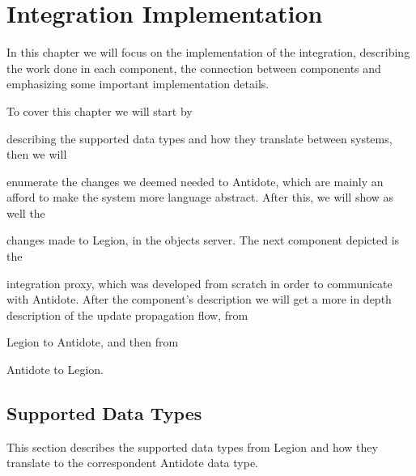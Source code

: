 \chapter{Integration Implementation}
\label{cha:integration_implementation}

In this chapter we will focus on the implementation of the integration, describing the work done in each component, the connection between components and emphasizing some important implementation details.\par
	To cover this chapter we will start by
\begin{enumerate*}[(i)]

\item describing the supported data types and how they translate between systems, then we will 

\item enumerate the changes we deemed needed to Antidote, which are mainly an afford to make the system more language abstract. After this, we will show as well the 

\item changes made to Legion, in the objects server. The next component depicted is the 

\item integration proxy, which was developed from scratch in order to communicate with Antidote. After the component's description we will get a more in depth description of the update propagation flow, from

\item Legion to Antidote, and then from

\item Antidote to Legion.

\end{enumerate*}	

\section{Supported Data Types}
\label{sec:supported_data_types}
This section describes the supported data types from Legion and how they translate to the correspondent Antidote data type.

